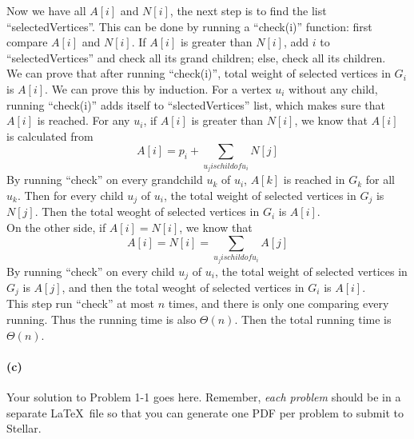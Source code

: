 \documentclass{6046}
\begin{document}
Now we have all $A[i]$ and $N[i]$, the next step is to find the list ``selectedVertices''. 
This can be done by running a ``check(i)'' function: 
first compare $A[i]$ and $N[i]$. 
If $A[i]$ is greater than $N[i]$, add $i$ to ``selectedVertices'' and check all its grand children; 
else, check all its children. 
\\
We can prove that after running ``check(i)'', 
total weight of selected vertices in $G_i$ is $A[i]$.
We can prove this by induction. 
For a vertex $u_i$ without any child, running ``check(i)'' 
adds itself to ``slectedVertices'' list, which makes sure that $A[i]$ is reached. 
For any $u_i$, if $A[i]$ is greater than $N[i]$, 
we know that $A[i]$ is calculated from 
$$A[i] = p_i + \sum_{u_j is child of u_i}N[j]$$
By running ``check'' on every grandchild $u_k$ of $u_i$, 
$A[k]$ is reached in $G_k$ for all $u_k$. 
Then for every child $u_j$ of $u_i$, the total weight of selected vertices in $G_j$ is 
$N[j]$. 
Then the total weoght of selected vertices in $G_i$ is $A[i]$. 
\\
On the other side, if $A[i] = N[i]$, 
we know that 
$$A[i] = N[i] = \sum_{u_j is child of u_i} A[j]$$
By running ``check'' on every child $u_j$ of $u_i$, 
the total weight of selected vertices in $G_j$ is $A[j]$, and 
then the total weoght of selected vertices in $G_i$ is $A[i]$. 
\\
This step run ``check'' at most $n$ times, and there is only one comparing every running. 
Thus the running time is also $\Theta(n)$. 
Then the total running time is $\Theta(n)$. 



\paragraph{(c)}




Your solution to Problem 1-1 goes here. Remember, \emph{each problem} should be
in a separate \LaTeX\ file so that you can generate one PDF per problem to
submit to Stellar.
\end{document}
